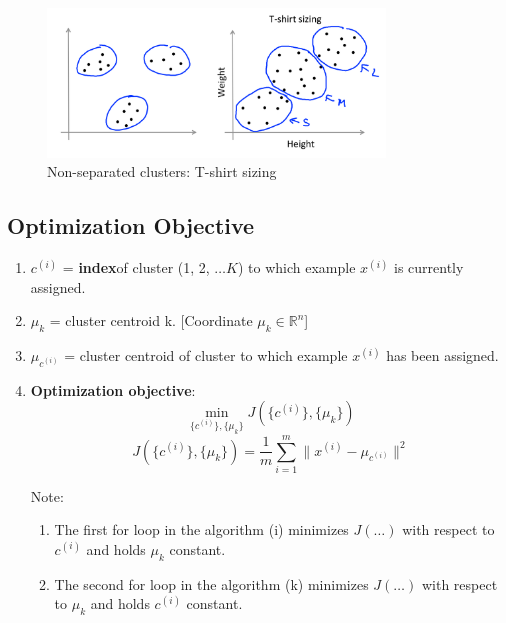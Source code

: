     \begin{figure}[htpb]
        \centering
        \includegraphics[width=0.8\textwidth]{image/t-shirt-sizing.png}
        \caption{Non-separated clusters: T-shirt sizing}
        \label{fig:t-shirt-sizing}
    \end{figure}
\subsection{Optimization Objective}
    \begin{enumerate}
        \item $c^{(i)}$ = \textbf{index}of cluster (1, 2, $\dots K$) to which example $x^{(i)}$ is currently assigned.
        \item $\mu_k$ = cluster centroid k. [Coordinate $\mu_k \in \mathbb{R}^n$]
        \item $\mu_{c^{(i)}}$ = cluster centroid of cluster to which example $x^{(i)}$ has been assigned.
        \item \textbf{Optimization objective}: \\
            \begin{equation}
                \min_{ \{c^{(i)}\}, \{\mu_k\} } J ( \{c^{(i)}\}, \{\mu_k\} )
                \label{eq:k-means-objective}
            \end{equation}
           \begin{equation}
                J ( \{c^{(i)}\}, \{\mu_k\} ) = \frac{1}{m} \sum_{i=1}^{m} \| x^{(i)} - \mu_{c^{(i)}} \|^2
               \label{eq:k-means-cost}
           \end{equation} 

           Note:
           \begin{enumerate}
               \item The first for loop in the algorithm (i) minimizes $J(\dots)$ with respect to $c^{(i)}$ and holds $\mu_k$ constant.
               \item The second for loop in the algorithm (k) minimizes $J(\dots)$ with respect to $\mu_k$ and holds $c^{(i)}$ constant.
           \end{enumerate}

    \end{enumerate}
